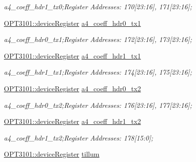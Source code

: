 \begin{DoxyCompactItemize}
\begin{DoxyCompactList}\small\item\em a4\+\_\+coeff\+\_\+hdr1\+\_\+tx0;Register Addresses\+: 170\mbox{[}23\+:16\mbox{]}, 171\mbox{[}23\+:16\mbox{]}; \end{DoxyCompactList}\item 
\mbox{\hyperlink{class_o_p_t3101_1_1device_register}{O\+P\+T3101\+::device\+Register}} \mbox{\hyperlink{class_o_p_t3101_1_1registers_aaf1ee1fcc051862860288ee037e606e1}{a4\+\_\+coeff\+\_\+hdr0\+\_\+tx1}}
\begin{DoxyCompactList}\small\item\em a4\+\_\+coeff\+\_\+hdr0\+\_\+tx1;Register Addresses\+: 172\mbox{[}23\+:16\mbox{]}, 173\mbox{[}23\+:16\mbox{]}; \end{DoxyCompactList}\item 
\mbox{\hyperlink{class_o_p_t3101_1_1device_register}{O\+P\+T3101\+::device\+Register}} \mbox{\hyperlink{class_o_p_t3101_1_1registers_aa839a019d58e2ae0e6556aea0e0f8c18}{a4\+\_\+coeff\+\_\+hdr1\+\_\+tx1}}
\begin{DoxyCompactList}\small\item\em a4\+\_\+coeff\+\_\+hdr1\+\_\+tx1;Register Addresses\+: 174\mbox{[}23\+:16\mbox{]}, 175\mbox{[}23\+:16\mbox{]}; \end{DoxyCompactList}\item 
\mbox{\hyperlink{class_o_p_t3101_1_1device_register}{O\+P\+T3101\+::device\+Register}} \mbox{\hyperlink{class_o_p_t3101_1_1registers_a25698ff7ff078e3594747f81fb86dcb8}{a4\+\_\+coeff\+\_\+hdr0\+\_\+tx2}}
\begin{DoxyCompactList}\small\item\em a4\+\_\+coeff\+\_\+hdr0\+\_\+tx2;Register Addresses\+: 176\mbox{[}23\+:16\mbox{]}, 177\mbox{[}23\+:16\mbox{]}; \end{DoxyCompactList}\item 
\mbox{\hyperlink{class_o_p_t3101_1_1device_register}{O\+P\+T3101\+::device\+Register}} \mbox{\hyperlink{class_o_p_t3101_1_1registers_ac956c3bd4cd5c475c5f515cd969ab90a}{a4\+\_\+coeff\+\_\+hdr1\+\_\+tx2}}
\begin{DoxyCompactList}\small\item\em a4\+\_\+coeff\+\_\+hdr1\+\_\+tx2;Register Addresses\+: 178\mbox{[}15\+:0\mbox{]}; \end{DoxyCompactList}\item 
\mbox{\hyperlink{class_o_p_t3101_1_1device_register}{O\+P\+T3101\+::device\+Register}} \mbox{\hyperlink{class_o_p_t3101_1_1registers_a8a097a41ecdf2b98226c4a3a92121c12}{tillum}}

\end{DoxyCompactItemize}
